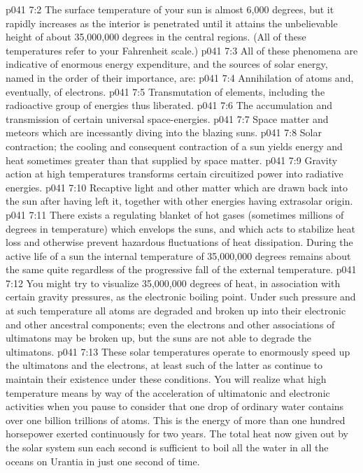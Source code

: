 \vs p041 7:2 The surface temperature of your sun is almost 6,000 degrees, but it rapidly increases as the interior is penetrated until it attains the unbelievable height of about 35,000,000 degrees in the central regions. (All of these temperatures refer to your Fahrenheit scale.)
\pc \vs p041 7:3 All of these phenomena are indicative of enormous energy expenditure, and the sources of solar energy, named in the order of their importance, are:
\pc \vs p041 7:4 \bibnobreakspace Annihilation of atoms and, eventually, of electrons.
\vs p041 7:5 \bibnobreakspace Transmutation of elements, including the radioactive group of energies thus liberated.
\vs p041 7:6 \bibnobreakspace The accumulation and transmission of certain universal space\hyp{}energies.
\vs p041 7:7 \bibnobreakspace Space matter and meteors which are incessantly diving into the blazing suns.
\vs p041 7:8 \bibnobreakspace Solar contraction; the cooling and consequent contraction of a sun yields energy and heat sometimes greater than that supplied by space matter.
\vs p041 7:9 \bibnobreakspace Gravity action at high temperatures transforms certain circuitized power into radiative energies.
\vs p041 7:10 \bibnobreakspace Recaptive light and other matter which are drawn back into the sun after having left it, together with other energies having extrasolar origin.
\pc \vs p041 7:11 There exists a regulating blanket of hot gases (sometimes millions of degrees in temperature) which envelops the suns, and which acts to stabilize heat loss and otherwise prevent hazardous fluctuations of heat dissipation. During the active life of a sun the internal temperature of 35,000,000 degrees remains about the same quite regardless of the progressive fall of the external temperature.
\pc \vs p041 7:12 You might try to visualize 35,000,000 degrees of heat, in association with certain gravity pressures, as the electronic boiling point. Under such pressure and at such temperature all atoms are degraded and broken up into their electronic and other ancestral components; even the electrons and other associations of ultimatons may be broken up, but the suns are not able to degrade the ultimatons.
\vs p041 7:13 These solar temperatures operate to enormously speed up the ultimatons and the electrons, at least such of the latter as continue to maintain their existence under these conditions. You will realize what high temperature means by way of the acceleration of ultimatonic and electronic activities when you pause to consider that one drop of ordinary water contains over one billion trillions of atoms. This is the energy of more than one hundred horsepower exerted continuously for two years. The total heat now given out by the solar system sun each second is sufficient to boil all the water in all the oceans on Urantia in just one second of time.
